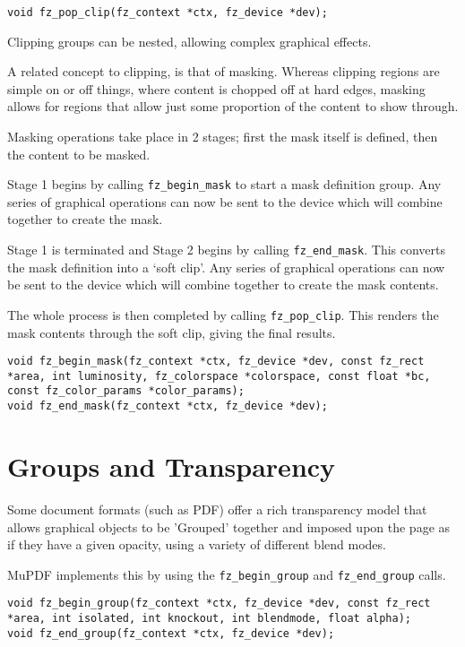 \documentclass[oneside]{book}
\begin{document}
\begin{lstlisting}
void fz_pop_clip(fz_context *ctx, fz_device *dev);
\end{lstlisting}

Clipping groups can be nested, allowing complex graphical effects.

A related concept to clipping, is that of masking. Whereas clipping regions are simple on or off things, where content is chopped off at hard edges, masking allows for regions that allow just some proportion of the content to show through.

Masking operations take place in 2 stages; first the mask itself is defined, then the content to be masked.

Stage 1 begins by calling \texttt{fz\_begin\_mask} to start a mask definition group. Any series of graphical operations can now be sent to the device which will combine together to create the mask.

Stage 1 is terminated and Stage 2 begins by calling \texttt{fz\_end\_mask}. This converts the mask definition into a `soft clip'. Any series of graphical operations can now be sent to the device which will combine together to create the mask contents.

The whole process is then completed by calling \texttt{fz\_pop\_clip}. This renders the mask contents through the soft clip, giving the final results.

\begin{lstlisting}
void fz_begin_mask(fz_context *ctx, fz_device *dev, const fz_rect *area, int luminosity, fz_colorspace *colorspace, const float *bc, const fz_color_params *color_params);
void fz_end_mask(fz_context *ctx, fz_device *dev);
\end{lstlisting}

\section{Groups and Transparency}

Some document formats (such as PDF) offer a rich transparency model that allows graphical objects to be 'Grouped' together and imposed upon the page as if they have a given opacity, using a variety of different blend modes.

MuPDF implements this by using the \texttt{fz\_begin\_group} and \texttt{fz\_end\_group} calls.

\begin{lstlisting}
void fz_begin_group(fz_context *ctx, fz_device *dev, const fz_rect *area, int isolated, int knockout, int blendmode, float alpha);
void fz_end_group(fz_context *ctx, fz_device *dev);
\end{lstlisting}
\end{document}
